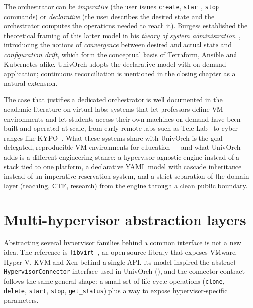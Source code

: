 The orchestrator can be \emph{imperative} (the user issues
\texttt{create}, \texttt{start}, \texttt{stop} commands) or
\emph{declarative} (the user describes the desired state and the
orchestrator computes the operations needed to reach it). Burgess
established the theoretical framing of this latter model in his
\emph{theory of system administration}~\cite{burgess2003theory},
introducing the notions of \emph{convergence} between desired and
actual state and \emph{configuration drift}, which form the
conceptual basis of Terraform, Ansible and Kubernetes alike. UnivOrch
adopts the declarative model with on-demand application;
continuous reconciliation is mentioned in the closing chapter as a
natural extension.

The case that justifies a dedicated orchestrator is well documented
in the academic literature on virtual labs: systems that let
professors define VM environments and let students access their own
machines on demand have been built and operated at scale, from early
remote labs such as Tele-Lab~\cite{willems2012telelab} to cyber
ranges like KYPO~\cite{vykopal2017kypo}. What these systems share with
UnivOrch is the goal --- delegated, reproducible VM environments for
education --- and what UnivOrch adds is a different engineering
stance: a hypervisor-agnostic engine instead of a stack tied to one
platform, a declarative YAML model with cascade inheritance instead of
an imperative reservation system, and a strict separation of the
domain layer (teaching, CTF, research) from the engine through a clean
public boundary.

\section{Multi-hypervisor abstraction layers}
\label{sec:multi-hv}

Abstracting several hypervisor families behind a common interface is
not a new idea. The reference is
\texttt{libvirt}~\cite{bolte2010libvirt}, an open-source library that
exposes VMware, Hyper-V, KVM and Xen behind a single API. Its model
inspired the abstract \texttt{HypervisorConnector} interface used in
UnivOrch (), and the connector contract follows
the same general shape: a small set of life-cycle operations
(\texttt{clone}, \texttt{delete}, \texttt{start}, \texttt{stop},
\texttt{get\_status}) plus a way to expose hypervisor-specific
parameters.

